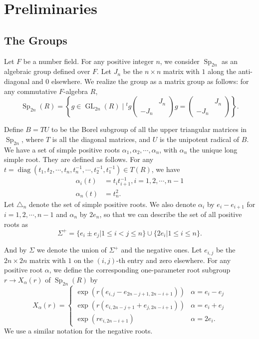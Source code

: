 \documentclass[11pt,notitlepage]{amsart}
\theoremstyle{definition}
\theoremstyle{remark}
\DeclareMathOperator{\GL}{GL}
\DeclareMathOperator{\Sp}{Sp}
\DeclareMathOperator{\diag}{diag}
\begin{document}
\section{Preliminaries}
\subsection{The Groups}
Let $F$ be a number field. For any positive integer $n$, we consider $\Sp_{2n}$ as an algebraic group defined over $F$. Let $J_n$ be the $n \times n$ matrix with $1$ along the anti-diagonal and $0$ elsewhere. We realize the group as a matrix group as follows: for any commutative $F$-algebra $R$,
\begin{equation}\Sp_{2n}(R) = \left\{g \in \GL_{2n}(R)\;|\; ^tg\begin{pmatrix}
  &J_n\\
  -J_n&
\end{pmatrix} g = \begin{pmatrix}
  &J_n\\
  -J_n&
\end{pmatrix} \right\}.
\end{equation}

Define $B=TU$ to be the Borel subgroup of all the upper triangular matrices in $\Sp_{2n}$, where $T$ is all the diagonal matrices, and $U$ is the unipotent radical of $B$. We have a set of simple positive roots $\alpha_1,\alpha_2,\cdots, \alpha_n$, with $\alpha_n$ the unique long simple root. They are defined as follows. For any $t = \diag(t_1,t_2,\cdots,t_n,t_n^{-1},\cdots,t_2^{-1},t_1^{-1})\in T(R)$, we have
\begin{align*}
  \alpha_i(t) &= t_it_{i+1}^{-1}, i= 1,2,\cdots, n-1\\
  \alpha_n(t) &= t_n^2.
\end{align*}
Let $\triangle_n$ denote the set of simple positive roots. We also denote $\alpha_i$ by $e_i - e_{i+1}$ for $i = 1,2,\cdots, n-1$ and $\alpha_n$ by $2e_n$, so that we can describe the set of all positive roots as
\begin{equation}
  \Sigma^+ = \{e_i\pm e_j|1\leqslant i<j\leqslant n\}\cup \{2e_i | 1\leqslant i\leqslant n\}.
\end{equation} 

And by $\Sigma$ we denote the union of $\Sigma^+$ and the negative ones. Let $e_{i,j}$ be the $2n \times 2n$ matrix with $1$ on the $(i,j)$-th entry and zero elsewhere. For any positive root $\alpha$, we define the corresponding one-parameter root subgroup $r \to X_\alpha(r)$ of $\Sp_{2n}(R)$ by 
\begin{equation}\label{rootdef}
 X_\alpha(r) = \begin{cases}
  \exp(r(e_{i,j} - e_{2n-j+1, 2n-i+1})) &\alpha = e_i -e_j\\
  \exp(r(e_{i,2n-j+1} + e_{j,2n-i+1})) &\alpha = e_i + e_j\\
  \exp(re_{i,2n-i+1}) &\alpha = 2e_i.
 \end{cases}
\end{equation}
We use a similar notation for the negative roots. 
\end{document}
